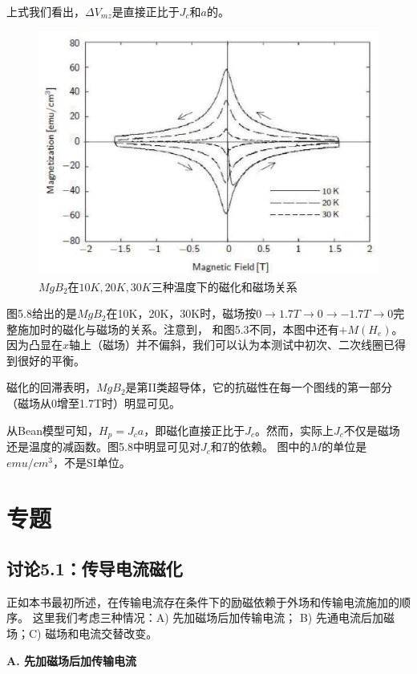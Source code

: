 上式我们看出，$\Delta V_{mz}$是直接正比于$J_c$和$a$的。
\begin{figure}[htbp]
  \centering
 \includegraphics[scale=0.7]{chpt5/figs/fig5.8.eps}
  \caption{$MgB_2$在$10K,20K,30K$三种温度下的磁化和磁场关系}\label{fig:magvfield}
\end{figure}
图5.8给出的是$MgB_2$在10K，20K，30K时，磁场按$0\rightarrow 1.7T\rightarrow 0 \rightarrow -1.7T\rightarrow 0$完整施加时的磁化与磁场的关系。注意到，
和图5.3不同，本图中还有$+M(H_e)$。因为凸显在$x$轴上（磁场）并不偏斜，我们可以认为本测试中初次、二次线圈已得到很好的平衡。

磁化的回滞表明，$MgB_2$是第II类超导体，它的抗磁性在每一个图线的第一部分（磁场从0增至1.7T时）明显可见。

从Bean模型可知，$H_p=J_c a$，即磁化直接正比于$J_c$。然而，实际上$J_c$不仅是磁场还是温度的减函数。图5.8中明显可见对$J_c$和$T$的依赖。
图中的$M$的单位是$emu/cm^3$，不是SI单位。

\section{专题}
\subsection{讨论5.1：传导电流磁化}
正如本书最初所述，在传输电流存在条件下的励磁依赖于外场和传输电流施加的顺序。
这里我们考虑三种情况：A) 先加磁场后加传输电流； B) 先通电流后加磁场；C) 磁场和电流交替改变。

\textbf{A.  先加磁场后加传输电流}

